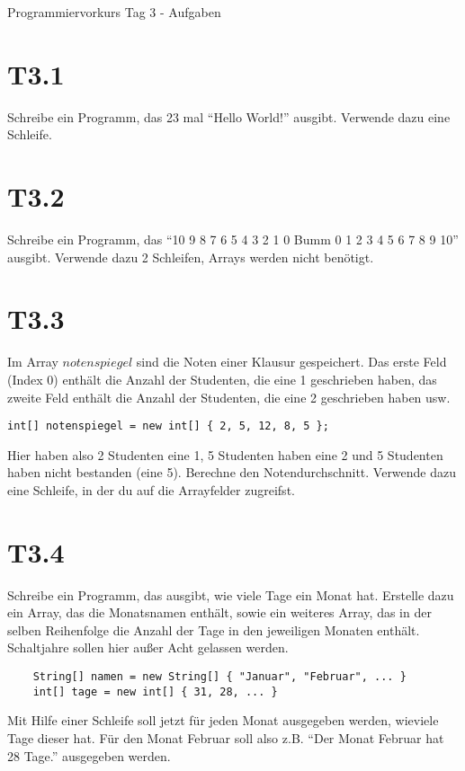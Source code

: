 \documentclass[final,a4paper]{article}
\begin{document}


{\huge Programmiervorkurs Tag 3 - Aufgaben}

\bigskip

\section*{T3.1}
	Schreibe ein Programm, das 23 mal "`Hello World!"' ausgibt. Verwende dazu eine Schleife.

\section*{T3.2}
	Schreibe ein Programm, das "`10 9 8 7 6 5 4 3 2 1 0 Bumm 0 1 2 3 4 5 6 7 8 9 10"' ausgibt.
	Verwende dazu 2 Schleifen, Arrays werden nicht benötigt.

\section*{T3.3}
	Im Array $notenspiegel$ sind die Noten einer Klausur gespeichert. Das erste Feld (Index $0$)
	enthält die Anzahl der Studenten, die eine 1 geschrieben haben, das zweite Feld enthält
	die Anzahl der Studenten, die eine 2 geschrieben haben usw.
\begin{lstlisting}
int[] notenspiegel = new int[] { 2, 5, 12, 8, 5 };
\end{lstlisting}
	Hier haben also 2 Studenten eine 1, 5 Studenten haben eine 2 und 5 Studenten haben nicht bestanden (eine 5).
	Berechne den Notendurchschnitt. Verwende dazu eine Schleife, in der du auf die Arrayfelder zugreifst.

\section*{T3.4}
	Schreibe ein Programm, das ausgibt, wie viele Tage ein Monat hat. Erstelle dazu ein Array,
	das die Monatsnamen enthält, sowie ein weiteres Array, das in der selben Reihenfolge die Anzahl
	der Tage in den jeweiligen Monaten enthält. Schaltjahre sollen hier außer Acht gelassen werden.
	\begin{lstlisting}
	String[] namen = new String[] { "Januar", "Februar", ... }
	int[] tage = new int[] { 31, 28, ... }
	\end{lstlisting}
	Mit Hilfe einer Schleife soll jetzt für jeden Monat ausgegeben werden, wieviele Tage dieser hat.
	Für den Monat Februar soll also z.B. "`Der Monat Februar hat 28 Tage."' ausgegeben werden.
\end{document}
